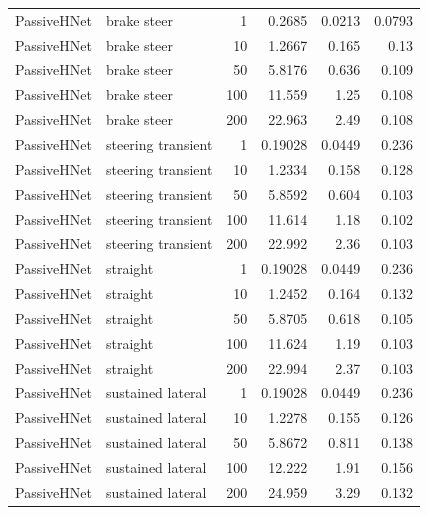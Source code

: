 \begin{tabular}{llrrrr}
PassiveHNet & brake steer & 1 & 0.2685 & 0.0213 & 0.0793 \\
PassiveHNet & brake steer & 10 & 1.2667 & 0.165 & 0.13 \\
PassiveHNet & brake steer & 50 & 5.8176 & 0.636 & 0.109 \\
PassiveHNet & brake steer & 100 & 11.559 & 1.25 & 0.108 \\
PassiveHNet & brake steer & 200 & 22.963 & 2.49 & 0.108 \\
PassiveHNet & steering transient & 1 & 0.19028 & 0.0449 & 0.236 \\
PassiveHNet & steering transient & 10 & 1.2334 & 0.158 & 0.128 \\
PassiveHNet & steering transient & 50 & 5.8592 & 0.604 & 0.103 \\
PassiveHNet & steering transient & 100 & 11.614 & 1.18 & 0.102 \\
PassiveHNet & steering transient & 200 & 22.992 & 2.36 & 0.103 \\
PassiveHNet & straight & 1 & 0.19028 & 0.0449 & 0.236 \\
PassiveHNet & straight & 10 & 1.2452 & 0.164 & 0.132 \\
PassiveHNet & straight & 50 & 5.8705 & 0.618 & 0.105 \\
PassiveHNet & straight & 100 & 11.624 & 1.19 & 0.103 \\
PassiveHNet & straight & 200 & 22.994 & 2.37 & 0.103 \\
PassiveHNet & sustained lateral & 1 & 0.19028 & 0.0449 & 0.236 \\
PassiveHNet & sustained lateral & 10 & 1.2278 & 0.155 & 0.126 \\
PassiveHNet & sustained lateral & 50 & 5.8672 & 0.811 & 0.138 \\
PassiveHNet & sustained lateral & 100 & 12.222 & 1.91 & 0.156 \\
PassiveHNet & sustained lateral & 200 & 24.959 & 3.29 & 0.132 \\
\bottomrule
\end{tabular}
